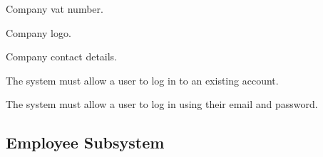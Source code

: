\documentclass{article}
\begin{document}
\begin{list}{R.}{}
\begin{list}{R.}{}
\begin{list}{R..}{}
				\item Company vat number.
				\item Company logo.
				\item Company contact details.
			\end{list} 
		\end{list}
		\item The system must allow a user to log in to an existing account.
		\begin{list}{R.}{}
			\item The system must allow a user to log in using their email and password.
		\end{list}
	\end{list}
	
	\subsection*{Employee Subsystem}	
\end{document}
